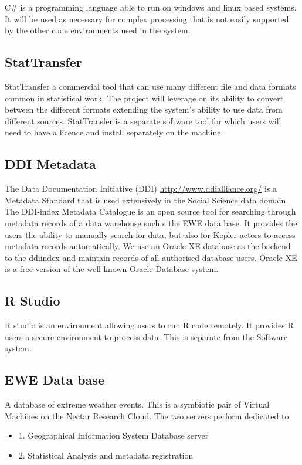 \documentclass[a4paper]{article}
\begin{document}
C\# is a programming language able to run on windows and linux based systems. It will be used as necessary for complex processing that is not easily supported by the other code environments used in the system.
\subsection{StatTransfer}
\label{sec-3-8}

StatTransfer a commercial tool that can use many different file and data formats common in statistical work. The project will leverage on its ability to convert between the different formats extending the system’s ability to use data from different sources. StatTransfer is a separate software tool for which users will need to have a licence and install separately on the machine.
\subsection{DDI Metadata}
\label{sec-3-9}

The Data Documentation Initiative (DDI) \href{http://www.ddialliance.org/}{http://www.ddialliance.org/} is a Metadata Standard that is used extensively in the Social Science data domain.  The DDI-index Metadata Catalogue is an open source tool for searching through metadata records of a data warehouse such s the EWE data base. It provides the users the ability to manually search for data, but also for Kepler actors to access metadata records automatically. We use an Oracle XE database as the backend to the ddiindex and maintain records of all authorised database users.  Oracle XE is a free version of the well-known Oracle Database system.
\subsection{R Studio}
\label{sec-3-10}

R studio is an environment allowing users to run R code remotely. It provides R users a secure environment to process data. This is separate from the Software system.
\subsection{EWE Data base}
\label{sec-3-11}

A database of extreme weather events.  This is a symbiotic pair of Virtual Machines on the Nectar Research Cloud. 
The two servers perform dedicated to:
\begin{itemize}
\item 1. Geographical Information System Database server
\item 2. Statistical Analysis and metadata registration
\end{itemize}
\end{document}
